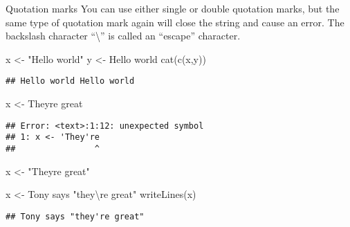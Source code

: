 \documentclass[
  10pt,
  ignorenonframetext,
  aspectratio=169]{beamer}
\newenvironment{Shaded}{\begin{snugshade}}{\end{snugshade}}
\newcommand{\FunctionTok}[1]{\textcolor[rgb]{0.94,0.94,0.56}{#1}}
\newcommand{\NormalTok}[1]{\textcolor[rgb]{0.80,0.80,0.80}{#1}}
\newcommand{\OtherTok}[1]{\textcolor[rgb]{0.94,0.94,0.56}{#1}}
\newcommand{\SpecialCharTok}[1]{\textcolor[rgb]{0.86,0.64,0.64}{#1}}
\newcommand{\StringTok}[1]{\textcolor[rgb]{0.80,0.58,0.58}{#1}}
\begin{document}
\begin{frame}[fragile]{Quotation marks}
\protect\hypertarget{quotation-marks}{}
You can use either single or double quotation marks, but the same type
of quotation mark again will close the string and cause an error. The
backslash character ``\textbackslash{}'' is called an ``escape''
character.

\scriptsize

\begin{Shaded}
\begin{Highlighting}[]
\NormalTok{x }\OtherTok{\textless{}{-}} \StringTok{"Hello world"}
\NormalTok{y }\OtherTok{\textless{}{-}} \StringTok{\textquotesingle{}Hello world\textquotesingle{}}
\FunctionTok{cat}\NormalTok{(}\FunctionTok{c}\NormalTok{(x,y))}
\end{Highlighting}
\end{Shaded}

\begin{verbatim}
## Hello world Hello world
\end{verbatim}

\medskip

\begin{Shaded}
\begin{Highlighting}[]
\NormalTok{x }\OtherTok{\textless{}{-}} \StringTok{\textquotesingle{}They\textquotesingle{}}\NormalTok{re great}\StringTok{\textquotesingle{}}
\end{Highlighting}
\end{Shaded}

\begin{verbatim}
## Error: <text>:1:12: unexpected symbol
## 1: x <- 'They're
##                ^
\end{verbatim}

\begin{Shaded}
\begin{Highlighting}[]
\NormalTok{x }\OtherTok{\textless{}{-}} \StringTok{"They\textquotesingle{}re great"}
\end{Highlighting}
\end{Shaded}

\begin{Shaded}
\begin{Highlighting}[]
\NormalTok{x }\OtherTok{\textless{}{-}} \StringTok{\textquotesingle{}Tony says "they}\SpecialCharTok{\textbackslash{}\textquotesingle{}}\StringTok{re great"\textquotesingle{}}
\FunctionTok{writeLines}\NormalTok{(x)}
\end{Highlighting}
\end{Shaded}

\begin{verbatim}
## Tony says "they're great"
\end{verbatim}
\end{frame}
\end{document}
